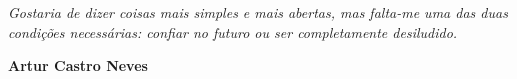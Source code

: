 \begin{epigrafe}
    \vspace*{\fill}
	\begin{flushright}
		\textit{Gostaria de dizer coisas mais simples e mais abertas, mas falta-me uma das duas condições necessárias: confiar no futuro ou ser completamente desiludido.}
		
		\textbf{Artur Castro Neves}
	\end{flushright}
\end{epigrafe}
